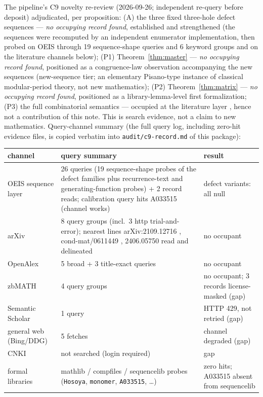 \documentclass[11pt]{article}
\begin{document}
The pipeline's C9 novelty re-review (2026-09-26; independent re-query
before deposit) adjudicated, per proposition: (A) the three fixed
three-hole defect sequences --- \emph{no occupying record found},
established and strengthened (the sequences were recomputed by an
independent enumerator implementation, then probed on OEIS through 19
sequence-shape queries and 6 keyword groups and on the literature channels
below); (P1) Theorem~\ref{thm:master} --- \emph{no occupying record found},
positioned as a congruence-law observation accompanying the new sequences
(new-sequence tier; an elementary Pisano-type instance of classical
modular-period theory, not new mathematics); (P2)
Theorem~\ref{thm:matrix} --- \emph{no occupying record found}, positioned
as a library-lemma-level first formalization; (P3) the full combinatorial
semantics --- occupied at the literature layer
\cite{lundow1996,lundow1998,oeis-a033515,oeis-a287428}, hence not a
contribution of this note. This is search evidence, not a claim to new
mathematics. Query-channel summary (the full query log, including zero-hit
evidence files, is copied verbatim into \texttt{audit/c9-record.md} of this
package):

\begin{center}
\begin{tabular}{p{}p{}p{}}
\hline
channel & query summary & result \\
\hline
OEIS sequence layer & 26 queries (19 sequence-shape probes of the defect
families plus recurrence-text and generating-function probes) + 2 record
reads; calibration query hits A033515 (channel works) & defect variants:
all null \\
arXiv & 8 query groups (incl.\ 3 http trial-and-error); nearest lines
arXiv:2109.12716 \cite{dey-krishnan}, cond-mat/0611449 \cite{kong},
2406.05750 \cite{arora} read and delineated & no occupant \\
OpenAlex & 5 broad + 3 title-exact queries & no occupant \\
zbMATH & 4 query groups & no occupant; 3 records license-masked (gap) \\
Semantic Scholar & 1 query & HTTP 429, not retried (gap) \\
general web (Bing/DDG) & 5 fetches & channel degraded (gap) \\
CNKI & not searched (login required) & gap \\
formal libraries & mathlib / compfiles / sequencelib probes
(\texttt{Hosoya}, \texttt{monomer}, \texttt{A033515}, \dots) & zero hits;
A033515 absent from sequencelib \\
\hline
\end{tabular}
\end{center}
\end{document}
